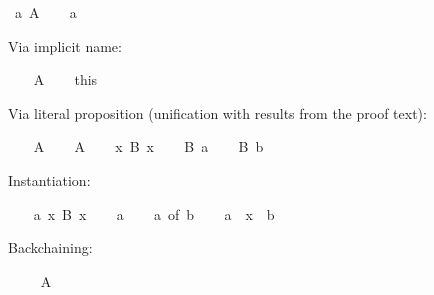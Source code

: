 \begin{isabellebody}
\ a{}\ A\isanewline
\ \ \isamarkupfalse%
\ a%
\begin{isamarkuptxt}%
Via implicit name:%
\end{isamarkuptxt}%
\isamarkuptrue%
\ \ \isamarkupfalse%
\ A\isanewline
\ \ \isamarkupfalse%
\ this%
\begin{isamarkuptxt}%
Via literal proposition (unification with results from the proof text):%
\end{isamarkuptxt}%
\isamarkuptrue%
\ \ \isamarkupfalse%
\ A\isanewline
\ \ \isamarkupfalse%
\ {}A{}\isanewline
\isanewline
\ \ \isamarkupfalse%
\ {}{}x{}\ B\ x{}\isanewline
\ \ \isamarkupfalse%
\ {}B\ a{}\isanewline
\ \ \isamarkupfalse%
\ {}B\ b{}%
\endisatagproof
{\isafoldproof}%
%
\isadelimproof
%
\endisadelimproof
\isanewline
{}\isamarkupfalse%
%
\isamarkuptrue%
\isamarkupfalse%
\isanewline
{}%
\isadelimproof
%
\endisadelimproof
%
\isatagproof
%
\begin{isamarkuptxt}%
Instantiation:%
\end{isamarkuptxt}%
\isamarkuptrue%
\ \ \isamarkupfalse%
\ a{}\ {}{}x{}\ B\ x{}\isanewline
\ \ \isamarkupfalse%
\ a\isanewline
\ \ \isamarkupfalse%
\ a\ {}of\ b{}\isanewline
\ \ \isamarkupfalse%
\ a\ {}\ x\ {}\ b{}%
\begin{isamarkuptxt}%
Backchaining:%
\end{isamarkuptxt}%
\isamarkuptrue%
\ \ \isamarkupfalse%
\ {}{}\ A\isanewline
\ \ \isamarkupfalse%

\end{isabellebody}
